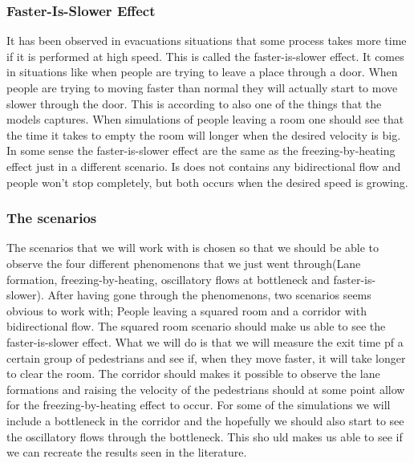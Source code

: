 \subsubsection{Faster-Is-Slower Effect}
It has been observed in evacuations situations that some process takes more 
time if it is performed at high speed. This is called the faster-is-slower effect. It comes in situations like when people are trying to leave a place through a door. When people are trying to moving faster than normal they will actually start to move slower through the door. This is according to \cite{self-org} also one of the things that the models captures. When simulations of people leaving a room one should see that the time it takes to empty the room will longer when the desired velocity is big.  In some sense the faster-is-slower effect are the same as the freezing-by-heating effect just in a different scenario. Is does not contains any bidirectional flow and people won't stop completely, but both occurs when the desired speed is growing. 

\subsubsection{The scenarios}
The scenarios that we will work with is chosen so that we should be able to observe the four different phenomenons that we just went through(Lane formation, freezing-by-heating, oscillatory flows at bottleneck and faster-is-slower). After having gone through the phenomenons, two scenarios seems obvious to work with; People leaving a squared room and a corridor with bidirectional flow. The squared room scenario should make us able to see the faster-is-slower effect. What we will do is that we will measure the exit time pf a certain group of pedestrians and see if, when they move faster, it will take longer to clear the room. The corridor should makes it possible to observe the lane formations and raising the velocity of the pedestrians should at some point allow for the freezing-by-heating effect to occur. For some of the simulations we will include a bottleneck in the corridor and the hopefully we should also start to see the oscillatory flows through the bottleneck. This sho
 uld makes us able to see if we can recreate the results seen in the literature.   


 

